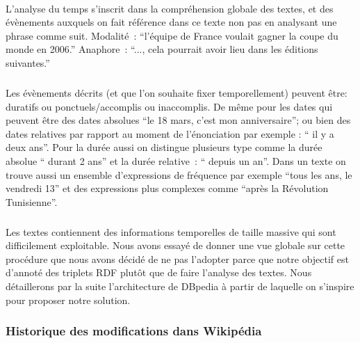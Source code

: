 \documentclass[12pt,a4	]{report}
\begin{document}
\paragraph{}
L’analyse du temps s’inscrit dans la compréhension globale des textes, et des évènements auxquels on fait référence dans ce texte non pas en analysant une phrase comme suit. 
\newline
Modalité~: ``l’équipe de France voulait gagner la coupe du monde en 2006.'' 
\newline
Anaphore~:  ``..., cela pourrait avoir lieu dans les éditions suivantes.''
\subparagraph{}
Les évènements décrits (et que l’on souhaite fixer temporellement) peuvent être: duratifs ou ponctuels/accomplis ou inaccomplis. 
De même pour les dates qui peuvent être des dates absolues ``le 18 mars, c'est mon anniversaire''; ou bien des dates relatives par rapport au moment de l’énonciation par exemple : `` il y a deux ans''. Pour la durée aussi on distingue plusieurs type comme la durée absolue `` durant 2 ans'' et la durée relative~: `` depuis un an''. Dans un texte on trouve aussi un ensemble d'expressions de fréquence par exemple ``tous les ans, le vendredi 13'' et des expressions plus complexes comme ``après la Révolution Tunisienne''.
\subparagraph{}
Les textes contiennent des informations temporelles de taille massive qui sont difficilement exploitable. Nous avons essayé de donner une vue globale sur cette procédure que nous avons décidé de ne pas l'adopter parce que notre objectif est d'annoté des triplets RDF plutôt que de faire l'analyse des textes. Nous détaillerons par la suite l'architecture de DBpedia à partir de laquelle on s'inspire pour proposer notre solution.
\subsubsection*{Historique des modifications dans Wikipédia}
\end{document}
